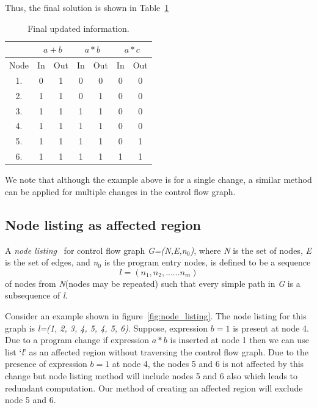 \documentclass[11pt,a4paper,openright]{report}
\begin{document}
Thus, the final solution is shown in Table~\ref{tab:Available_exp_final_solution}

\begin{table}[H]
  \begin{center}
    \begin{tabular}{c c c c c c c }
    \hline
       & \multicolumn{2}{c}{$a+b$} & \multicolumn{2}{c}{$a*b$} & \multicolumn{2}{c}{$a*c$} \\
    \hline
      Node & In & Out & In & Out & In & Out\\
   	\midrule
   	  1. & 0 & 1 &0 & 0 & 0 & 0 \\
   	  2. & 1 & 1 & 0 & 1 & 0 & 0  \\
   	  3. & 1 & 1 & 1 & 1 & 0 & 0 \\
   	  4. & 1 & 1 & 1 & 1 & 0 & 0 \\
   	  5. & 1 & 1 & 1 & 1& 0 & 1 \\
   	  6. & 1 & 1 & 1 & 1 & 1 & 1\\
      
      \bottomrule 
    \end{tabular}
    \caption{Final updated information.}
      \label{tab:Available_exp_final_solution}
  \end{center}
\end{table}

We note that although the example above is for a single change, a similar method can be applied for multiple changes in the control flow graph.

\subsection{Node listing as affected region}
A \textit{node listing}~\cite{node_listing} for control flow graph \textit{G=(N,E,n$_0$)}, where \textit{N} is the set of nodes, \textit{E} is the set of edges, and \textit{n$_0$} is the
program entry nodes, is defined to be a sequence 
\begin{equation}
 l=(n_1, n_2, ......n_m)
\end{equation}
of nodes from \textit{N}(nodes may be repeated) such that every simple path in \textit{G} is a subsequence of \textit{l}. 

Consider an example shown in figure~\ref{fig:node_listing}. The node listing for this graph is \textit{l=(1, 2, 3, 4, 5, 4, 5, 6)}. Suppose, expression $b=1$ is present at
node 4. Due to a program change if expression $a*b$ is inserted at node 1 then we can use list `\textit{l}' as an affected region without traversing the control flow 
graph. Due to the presence of expression $b=1$ at node 4, the nodes 5 and 6 is not affected by this change but node listing method will include nodes 5 and 6
also which leads to redundant computation. Our method of creating an affected region will exclude node 5 and 6.
\end{document}
